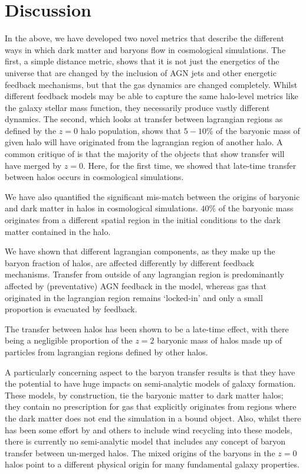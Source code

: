 \section{Discussion}
\label{sec:conclusions}

In the above, we have developed two novel metrics that describe the different
ways in which dark matter and baryons flow in cosmological simulations. The
first, a simple distance metric, shows that it is not just the energetics of
the universe that are changed by the inclusion of AGN jets and other energetic
feedback mechanisms, but that the gas dynamics are changed completely. Whilst
different feedback models may be able to capture the same halo-level metrics
like the galaxy stellar mass function, they necessarily produce vastly
different dynamics. The second, which looks at transfer between lagrangian
regions as defined by the $z=0$ halo population, shows that $5-10\%$ of the
baryonic mass of given halo will have originated from the lagrangian region
of another halo. A common critique of \citet{AnglesAlcazar2017} is that the
majority of the objects that show transfer will have merged by $z=0$. Here,
for the first time, we showed that late-time transfer between halos occurs
in cosmological simulations.

We have also quantified the significant mis-match between the origins of
baryonic and dark matter in halos in cosmological simulations. $40\%$ of the
baryonic mass originates from a different spatial region in the initial
conditions to the dark matter contained in the halo.

We have shown that different lagrangian components, as they make up the
baryon fraction of halos, are affected differently by different feedback
mechanisms. Transfer from outside of any lagrangian region is predominantly
affected by (preventative) AGN feedback in the \simba{} model, whereas gas
that originated in the lagrangian region remains `locked-in' and only a small
proportion is evacuated by feedback.

The transfer between halos has been shown to be a late-time effect, with
there being a negligible proportion of the $z=2$ baryonic mass of halos
made up of particles from lagrangian regions defined by other halos.

A particularly concerning aspect to the baryon transfer results is that they
have the potential to have huge impacts on semi-analytic models of galaxy
formation. These models, by construction, tie the baryonic matter to dark
matter halos; they contain no prescription for gas that explicitly originates
from regions where the dark matter does not end the simulation in a bound
object. Also, whilst there has been some effort by \citet{Henriques2015} and
others to include wind recycling into these models, there is currently
no semi-analytic model that includes any concept of baryon transfer between
un-merged halos. The mixed origins of the baryons in the $z=0$ halos
point to a different physical origin for many fundamental galaxy properties.

